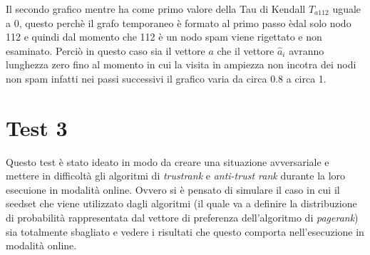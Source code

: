 Il secondo grafico mentre ha come primo valore della Tau di Kendall \(T_{a112}\) uguale a 0, questo perchè il grafo temporaneo è formato al primo passo èdal solo nodo 112 e quindi dal momento che 112 è un nodo spam viene rigettato e non esaminato. Perciò in questo caso sia il vettore \(a\) che il vettore \(\hat{a}_i\) avranno lunghezza zero fino al momento in cui la visita in ampiezza non incotra dei nodi non spam infatti nei passi successivi il grafico varia da circa 0.8 a circa 1.

\section{Test 3}
Questo test è stato ideato in modo da creare una situazione avversariale e mettere in difficoltà gli algoritmi di \textit{trustrank} e \textit{anti-trust rank} durante la loro esecuione in modalità online. Ovvero si è pensato di simulare il caso in cui il seedset che viene utilizzato dagli algoritmi (il quale va a definire la distribuzione di probabilità rappresentata dal vettore di preferenza dell'algoritmo di \textit{pagerank}) sia totalmente sbagliato e vedere i risultati che questo comporta nell'esecuzione in modalità online.

